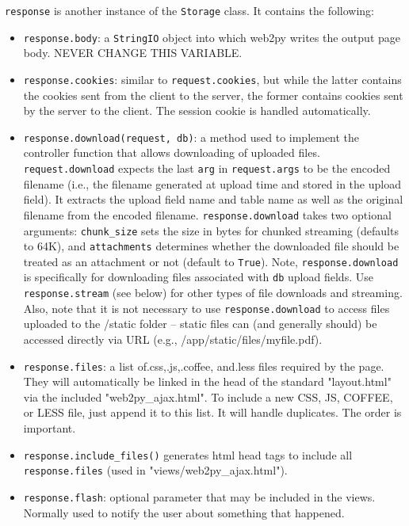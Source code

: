 \documentclass[justified,sixbynine,notoc]{tufte-book}
\def\ft{\small\tt}
\begin{document}
\begin{fullwidth}
{\ft response} is another instance of the {\ft Storage} class. It contains the following:

\begin{itemize}
\item {\ft response.body}: a {\ft StringIO} object into which web2py writes the output page body. NEVER CHANGE THIS VARIABLE.

\item {\ft response.cookies}: similar to {\ft request.cookies}, but while the latter contains the cookies sent from the client to the server, the former contains cookies sent by the server to the client. The session cookie is handled automatically.

\item {\ft response.download(request, db)}: a method used to implement the controller function that allows downloading of uploaded files. {\ft request.download} expects the last {\ft arg} in {\ft request.args} to be the encoded filename (i.e., the filename generated at upload time and stored in the upload field). It extracts the upload field name and table name as well as the original filename from the encoded filename. {\ft response.download} takes two optional arguments: {\ft chunk\_size} sets the size in bytes for chunked streaming (defaults to 64K), and {\ft attachments} determines whether the downloaded file should be treated as an attachment or not (default to {\ft True}). Note, {\ft response.download} is specifically for downloading files associated with {\ft db} upload fields. Use {\ft response.stream} (see below) for other types of file downloads and streaming. Also, note that it is not necessary to use {\ft response.download} to access files uploaded to the /static folder -- static files can (and generally should) be accessed directly via URL (e.g., /app/static/files/myfile.pdf).

\item {\ft response.files}: a list of.css,.js,.coffee, and.less files required by the page. They will automatically be linked in the head of the standard "layout.html" via the included "web2py\_ajax.html". To include a new CSS, JS, COFFEE, or LESS file, just append it to this list. It will handle duplicates. The order is important.

\item {\ft response.include\_files()} generates html head tags to include all {\ft response.files} (used in "views/web2py\_ajax.html").

\item {\ft response.flash}: optional parameter that may be included in the views. Normally used to notify the user about something that happened.


\end{itemize}
\end{fullwidth}
\end{document}
